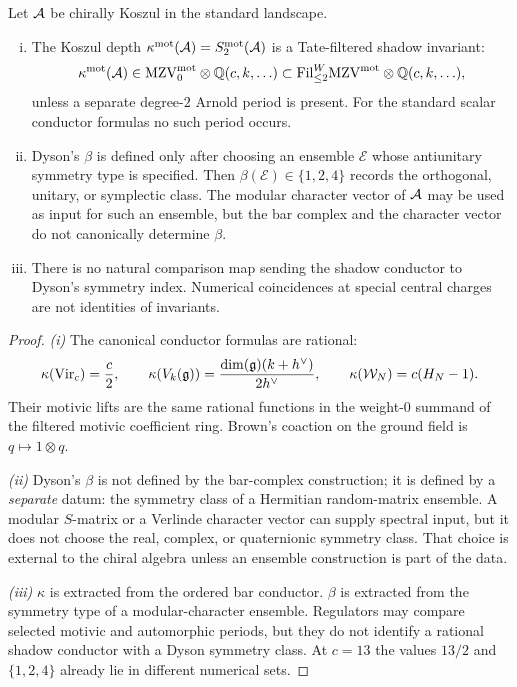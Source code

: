 \begin{theorem}
\ClaimStatusProvedHere
Let $\mathcal{A}$ be chirally Koszul in the standard landscape.
\begin{enumerate}[(i)]
\item The Koszul depth
$\kappa^{\mathrm{mot}}(\mathcal{A})=S_2^{\mathrm{mot}}(\mathcal{A})$ is a Tate-filtered shadow
invariant:
\[
\kappa^{\mathrm{mot}}(\mathcal{A})\in
\mathrm{MZV}^{\mathrm{mot}}_{0}\otimes\mathbb Q(c,k,\ldots)
\subset
\mathrm{Fil}^W_{\le2}\mathrm{MZV}^{\mathrm{mot}}\otimes\mathbb Q(c,k,\ldots),
\]
unless a separate degree-$2$ Arnold period is present. For the standard
scalar conductor formulas no such period occurs.
\item Dyson's $\beta$ is defined only after choosing an ensemble
$\mathcal E$ whose antiunitary symmetry type is specified. Then
$\beta(\mathcal E)\in\{1,2,4\}$ records the orthogonal, unitary, or
symplectic class. The modular character vector of $\mathcal{A}$ may be used as
input for such an ensemble, but the bar complex and the character
vector do not canonically determine $\beta$.
\item There is no natural comparison map sending the shadow conductor
to Dyson's symmetry index. Numerical coincidences at special central
charges are not identities of invariants.
\end{enumerate}
\end{theorem}

\begin{proof}
\emph{(i)} The canonical conductor formulas are rational:
\[
\kappa(\mathrm{Vir}_c)=\frac c2,\qquad
\kappa(V_k(\mathfrak{g}))=\frac{\dim(\mathfrak{g})(k+h^\vee)}{2h^\vee},\qquad
\kappa(\mathcal W_N)=c(H_N-1).
\]
Their motivic lifts are the same rational functions in the
weight-$0$ summand of the filtered motivic coefficient ring. Brown's
coaction on the ground field is $q\mapsto1\otimes q$.

\emph{(ii)} Dyson's $\beta$ is not defined by the bar-complex
construction; it is defined by a \emph{separate} datum: the symmetry
class of a Hermitian random-matrix ensemble. A modular $S$-matrix or a
Verlinde character vector can supply spectral input, but it does not
choose the real, complex, or quaternionic symmetry class. That choice
is external to the chiral algebra unless an ensemble construction is
part of the data.

\emph{(iii)} $\kappa$ is extracted from the ordered bar conductor.
$\beta$ is extracted from the symmetry type of a modular-character
ensemble. Regulators may compare selected motivic and automorphic
periods, but they do not identify a rational shadow conductor with a
Dyson symmetry class. At $c=13$ the values $13/2$ and
$\{1,2,4\}$ already lie in different numerical sets.
\end{proof}

